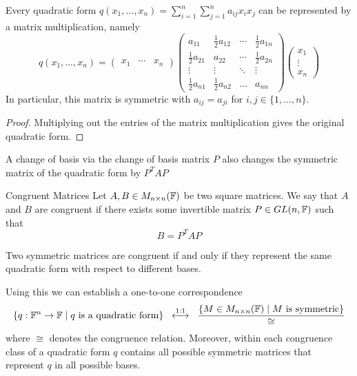 \documentclass[a4paper]{article}
\begin{document}
\begin{prp}{}{} Every quadratic form $q(x_1,\dots,x_n)=\sum_{i=1}^n\sum_{j=1}^na_{ij}x_ix_j$ can be represented by a matrix multiplication, namely $$q(x_1,\dots,x_n)=\begin{pmatrix}x_1 & \cdots & x_n\end{pmatrix}\begin{pmatrix}a_{11} & \frac{1}{2}a_{12} & \cdots & \frac{1}{2}a_{1n}\\
\frac{1}{2}a_{21} & a_{22} & \cdots & \frac{1}{2}a_{2n}\\
\vdots & \vdots & \ddots & \vdots\\
\frac{1}{2}a_{n1} & \frac{1}{2}a_{n2} & \dots & a_{nn}
\end{pmatrix}\begin{pmatrix}x_1 \\ \vdots \\ x_n\end{pmatrix}$$ In particular, this matrix is symmetric with $a_{ij}=a_{ji}$ for $i,j\in\{1,\dots,n\}$. \tcbline
\begin{proof}
Multiplying out the entries of the matrix multiplication gives the original quadratic form. 
\end{proof}
\end{prp}

\begin{prp}{}{} A change of basis via the change of basis matrix $P$ also changes the symmetric matrix of the quadratic form by $P^TAP$
\end{prp}

\begin{defn}{Congruent Matrices}{} Let $A,B\in M_{n\times n}(\mathbb{F})$ be two square matrices. We say that $A$ and $B$ are congruent if there exists some invertible matrix $P\in GL(n,\mathbb{F})$ such that $$B=P^TAP$$
\end{defn}

\begin{prp}{}{} Two symmetric matrices are congruent if and only if they represent the same quadratic form with respect to different bases. 
\end{prp}

Using this we can establish a one-to-one correspondence $$\left\{q:\mathbb{F}^n\to\mathbb{F}\;|\;q\text{ is a quadratic form}\right\}\;\;\overset{1:1}{\longleftrightarrow}\;\;\frac{\left\{M\in M_{n\times n}(\mathbb{F})\;|\;M\text{ is symmetric}\right\}}{\cong}$$ where $\cong$ denotes the congruence relation. Moreover, within each congruence class of a quadratic form $q$ contains all possible symmetric matrices that represent $q$ in all possible bases. 
\end{document}
